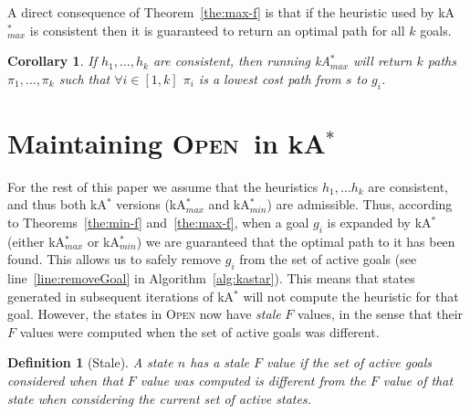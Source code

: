 \documentclass{aicom2e}
\newtheorem{definition}{Definition}
\newtheorem{corollary}{Corollary}
\newcommand{\kastar}{kA$^*$}
\newcommand{\kastarmin}{kA$^*_{min}$}
\newcommand{\kastarmax}{kA$^*_{max}$}
\newcommand{\open}{\textsc{Open}}
\newcommand{\roni}[1]{\textbf{[RS:#1]}}
\begin{document}
A direct consequence of Theorem~\ref{the:max-f} is that
if the heuristic used by \kastarmax{} is consistent then
it is guaranteed to return an optimal path for all $k$ goals.

\begin{corollary}%
If $h_1,\ldots,h_k$ are consistent, then running \kastarmax{} will return $k$ paths $\pi_1,\ldots, \pi_k$ such that $\forall i\in[1,k]$ $\pi_i$ is a lowest cost path from $s$ to $g_i$. \label{cor:max-f}
\end{corollary}


\section{Maintaining \open\ in \kastar{}} \label{sec:lazy}



For the rest of this paper we assume that the heuristics $h_1,\ldots h_k$ are
consistent, and thus both \kastar{} versions  (\kastarmax{} and \kastarmin{})
are admissible. Thus, according to Theorems~\ref{the:min-f}
and~\ref{the:max-f}, when a goal $g_i$ is expanded by \kastar{} (either
\kastarmax{} or \kastarmin{}) we are guaranteed that the optimal path to it has
been found. This allows us to safely remove $g_i$ from the set of active goals
(see line~\ref{line:removeGoal} in Algorithm~\ref{alg:kastar}). This means that
states generated in subsequent iterations of \kastar{} will not compute the
heuristic for that goal. However, the states in \open{} now have {\em stale}
$F$ values, in the sense that their $F$ values were computed when the set of
active goals was different.
\begin{definition}[Stale]
    A state $n$ has a stale $F$ value if the set of active goals considered when that $F$ value was computed
    is different from the $F$ value of that state when considering the current set of active states.
\end{definition}


\end{document}

